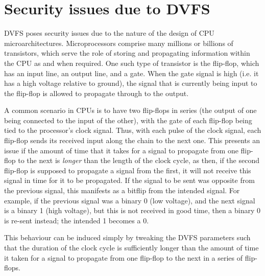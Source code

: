 \section{Security issues due to DVFS}

DVFS poses security issues due to the nature of the design of CPU
microarchitectures. Microprocessors comprise many millions or billions of
transistors, which serve the role of storing and propagating information within
the CPU as and when required. One such type of transistor is the flip-flop,
which has an input line, an output line, and a gate. When the gate signal is
high (i.e. it has a high voltage relative to ground), the signal that is
currently being input to the flip-flop is allowed to propagate through to the
output.

A common scenario in CPUs is to have two flip-flops in series (the
output of one being connected to the input of the other), with the gate of each
flip-flop being tied to the processor's clock signal. Thus, with each pulse of
the clock signal, each flip-flop sends its received input along the chain to the
next one. This presents an issue if the amount of time that it takes for a
signal to propagate from one flip-flop to the next is \emph{longer} than the
length of the clock cycle, as then, if the second flip-flop is supposed to
propagate a signal from the first, it will not receive this signal in time for
it to be propagated. If the signal to be sent was opposite from the previous
signal, this manifests as a bitflip from the intended signal. For example, if
the previous signal was a binary 0 (low voltage), and the next signal is a
binary 1 (high voltage), but this is not received in good time, then a binary 0
is re-sent instead; the intended 1 becomes a 0.

This behaviour can be induced simply by tweaking the DVFS parameters such that
the duration of the clock cycle is sufficiently longer than the amount of time
it taken for a signal to propagate from one flip-flop to the next in a series
of flip-flops.
